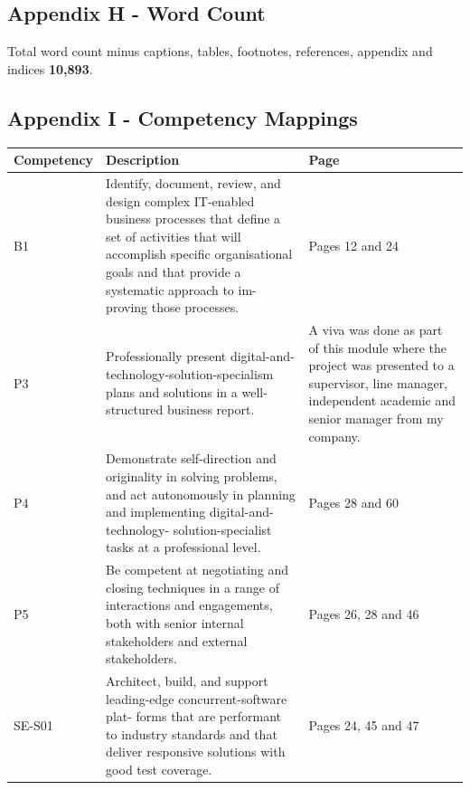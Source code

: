   \newpage
  \subsection{Appendix H - Word Count}
  Total word count minus captions, tables, footnotes, references, appendix and indices \textbf{10,893}. 
  
  \newpage
  \subsection{Appendix I - Competency Mappings}
    \begin{longtable}{|p{2cm}|p{8cm}|p{4cm}|}
      \hline
      \textbf{Competency} & \textbf{Description} & \textbf{Page} \\ \hline
      B1                  & Identify, document, review, and design complex IT-enabled business
                            processes that define a set of activities that will accomplish specific
                            organisational goals and that provide a systematic approach to im-
                            proving those processes. & Pages 12 and 24 \\ \hline

      P3                  & Professionally present digital-and-technology-solution-specialism plans
                            and solutions in a well- structured business report. 
                            
                          & A viva was done as part of this module where the project was presented to a supervisor, line manager, independent
                          academic and senior manager from my company. \\ \hline

      P4                  & Demonstrate self-direction and originality in solving problems, and
                            act autonomously in planning and implementing digital-and-technology-
                            solution-specialist tasks at a professional level. & Pages 28 and 60 \\ \hline

      P5                  & Be competent at negotiating and closing techniques in a range of
                            interactions and engagements, both with senior internal stakeholders
                            and external stakeholders. & Pages 26, 28 and 46 \\ \hline

      SE-S01              & Architect, build, and support leading-edge concurrent-software plat-
                            forms that are performant to industry standards and that deliver
                            responsive solutions with good test coverage. & Pages 24, 45 and 47 \\ \hline


\end{longtable}
